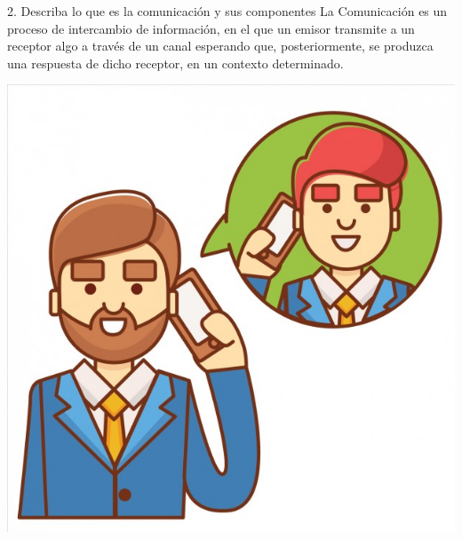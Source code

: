 \documentclass{beamer}
\begin{document}
\begin{frame}
\begin{block}{2. Describa lo que es la comunicación y sus componentes}
La Comunicación es un proceso de intercambio de información, en el que un emisor transmite a un receptor algo a través de un canal esperando que, posteriormente, se produzca una respuesta de dicho receptor, en un contexto determinado.
\begin{center}
\includegraphics[scale = 0.1]{3.png}
\end{center}
\end{block}
\end{frame}
\end{document}
